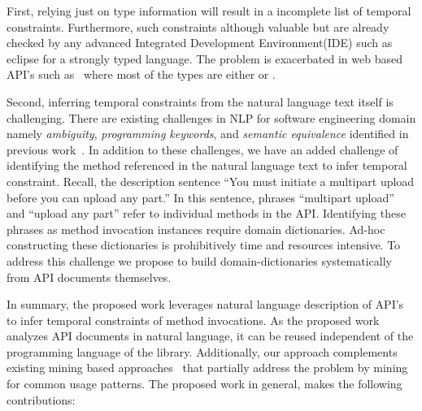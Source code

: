 First, relying just on type information will result in a incomplete list of temporal constraints. 
Furthermore, such constraints although valuable but are already checked by any advanced Integrated Development Environment(IDE) such as eclipse
for a strongly typed language.
The problem is exacerbated in web based API's such as \amazonAPI\ where most of the types are either  or .

Second, inferring temporal constraints from the natural language text itself is challenging. 
There are existing challenges in NLP for software engineering domain namely \textit{ambiguity}, \textit{programming keywords}, and \textit{semantic equivalence} identified in previous work~\cite{pandita12:inferring}.
In addition to these challenges, we have an added challenge of identifying the method referenced in the natural language text to infer temporal constraint.
Recall, the description sentence ``You must initiate a multipart upload before you can upload any part.''
In this sentence, phrases ``multipart upload'' and ``upload any part'' refer to individual methods in the API.
Identifying these phrases as method invocation instances require domain dictionaries.
Ad-hoc constructing these dictionaries is prohibitively time and resources intensive.
To address this challenge we propose to build domain-dictionaries systematically from API documents themselves.  

In summary, the proposed work leverages natural language description of API's to infer temporal constraints of method invocations.
As the proposed work analyzes API documents in natural language, it can be reused independent of the programming language of the library.
Additionally, our approach complements existing mining based approaches~\cite{buse2012synthesizing, thummalapenta07parseweb, Wang:2013:MSR, Zhong:2009:MMR} that partially address the problem by mining for common usage patterns.
The proposed work in general, makes the following contributions:



